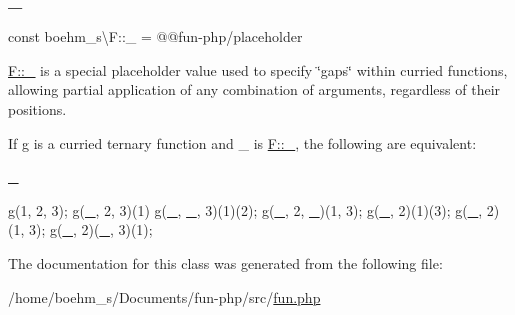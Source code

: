 \subsubsection{\texorpdfstring{\+\_\+}{\_}}
{\footnotesize\ttfamily const boehm\+\_\+s\textbackslash{}\+F\+::\+\_\+ = \textquotesingle{}@@fun-\/php/placeholder\textquotesingle{}}



{\ttfamily \hyperlink{classboehm__s_1_1F_ab837ec3c9abe3d1a244817fd4c18eda7}{F\+::\+\_\+}} is a special placeholder value used to specify \char`\"{}gaps\char`\"{} within curried functions, allowing partial application of any combination of arguments, regardless of their positions. 

If g is a curried ternary function and {\ttfamily \+\_\+} is {\ttfamily \hyperlink{classboehm__s_1_1F_ab837ec3c9abe3d1a244817fd4c18eda7}{F\+::\+\_\+}}, the following are equivalent\+:


\begin{DoxyCode}
\hyperlink{classboehm__s_1_1F_ab837ec3c9abe3d1a244817fd4c18eda7}{\_} 
\end{DoxyCode}



\begin{DoxyCode}
g(1, 2, 3);
g(\hyperlink{classboehm__s_1_1F_ab837ec3c9abe3d1a244817fd4c18eda7}{\_}, 2, 3)(1)
g(\hyperlink{classboehm__s_1_1F_ab837ec3c9abe3d1a244817fd4c18eda7}{\_}, \hyperlink{classboehm__s_1_1F_ab837ec3c9abe3d1a244817fd4c18eda7}{\_}, 3)(1)(2);
g(\hyperlink{classboehm__s_1_1F_ab837ec3c9abe3d1a244817fd4c18eda7}{\_}, 2, \hyperlink{classboehm__s_1_1F_ab837ec3c9abe3d1a244817fd4c18eda7}{\_})(1, 3);
g(\hyperlink{classboehm__s_1_1F_ab837ec3c9abe3d1a244817fd4c18eda7}{\_}, 2)(1)(3);
g(\hyperlink{classboehm__s_1_1F_ab837ec3c9abe3d1a244817fd4c18eda7}{\_}, 2)(1, 3);
g(\hyperlink{classboehm__s_1_1F_ab837ec3c9abe3d1a244817fd4c18eda7}{\_}, 2)(\hyperlink{classboehm__s_1_1F_ab837ec3c9abe3d1a244817fd4c18eda7}{\_}, 3)(1);
\end{DoxyCode}
 

The documentation for this class was generated from the following file\+:\begin{DoxyCompactItemize}
\item 
/home/boehm\+\_\+s/\+Documents/fun-\/php/src/\hyperlink{fun_8php}{fun.\+php}\end{DoxyCompactItemize}
